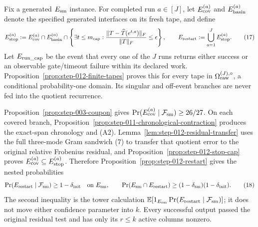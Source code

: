 Fix a generated \(E_{\rm sm}\) instance.  For completed run
\(a\in[J]\), let \(E_{\rm cov}^{(a)}\) and \(E_{\rm basin}^{(a)}\) denote
the specified generated interfaces on its fresh tape, and define
\[
 E_{\rm stop}^{(a)}:=E_{\rm cov}^{(a)}\cap E_{\rm basin}^{(a)}\cap
 \left\{\exists t\le m_{\rm cap}:
 {\|T-\widehat T(e^{t,a})\|_F\over\|T\|_F}\le\epsilon\right\},
 \qquad
 E_{\rm restart}:=\bigcup_{a=1}^J E_{\rm stop}^{(a)}.
\tag{17}
\]
Let \(E_{\rm run\_cap}\) be the event that every one of the \(J\) runs
returns either success or an observable gate/timeout failure within its
declared work.  Proposition~\ref{prop:step-012-finite-tapes} proves this for
every tape in \(\Omega_{\rm raw}^{(J),\circ}\), a conditional
probability-one domain.  Its singular and off-event branches are never fed
into the quotient recurrence.

Proposition~\ref{prop:step-003-coupon} gives
\(\Pr(E_{\rm cov}^{(a)}\mid{\cal F}_{\rm sm})\ge26/27\).  On each covered
branch, Proposition~\ref{prop:step-011-chronological-contraction} produces
the exact-span chronology and (A2).  Lemma~\ref{lem:step-012-residual-transfer}
uses the full three-mode Gram sandwich (7) to transfer that quotient error to
the original relative Frobenius residual, and
Proposition~\ref{prop:step-012-stop-cap} proves
\(E_{\rm cov}^{(a)}\subseteq E_{\rm stop}^{(a)}\).  Therefore
Proposition~\ref{prop:step-012-restart} gives the nested probabilities
\[
 \Pr(E_{\rm restart}\mid{\cal F}_{\rm sm})\ge1-\delta_{\rm init}
 \quad\text{on }E_{\rm sm},
 \qquad
 \Pr(E_{\rm sm}\cap E_{\rm restart})
 \ge(1-\delta_{\rm sm})(1-\delta_{\rm init}).
\tag{18}
\]
The second inequality is the tower calculation
\(\mathbb E[1_{E_{\rm sm}}
\Pr(E_{\rm restart}\mid{\cal F}_{\rm sm})]\); it does not move either
confidence parameter into \(k\).  Every successful output passed the original
residual test and has only its \(r\le k\) active columns nonzero.

